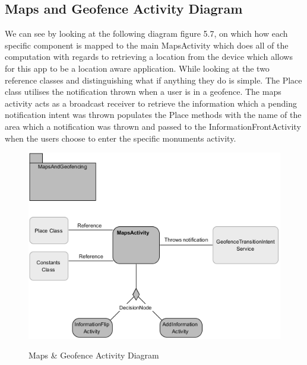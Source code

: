 \subsection{Maps and Geofence Activity Diagram}
We can see by looking at the following diagram figure 5.7, on which how each specific component is mapped to the main MapsActivity which does all of the computation with regards to retrieving a location from the device which allows for this app to be a location aware application. While looking at the two reference classes and distinguishing what if anything they do is simple. The Place class utilises the notification thrown when a user is in a geofence. The maps activity acts as a broadcast receiver to retrieve the information which a pending notification intent was thrown populates the Place methods with the name of the area which a notification was thrown and passed to the InformationFrontActivity when the users choose to enter the specific monuments activity.\par

\begin{figure}[htbp]
    \center \includegraphics[width=450pt]{MapsGeofenceActivity}\\
    \caption{Maps \& Geofence Activity Diagram} \label{Figure: Maps & Geofence Activity Diagram }
\end{figure}
\newpage
